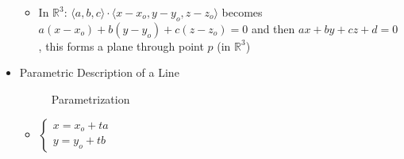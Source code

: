 \begin{itemize}
\begin{itemize}
\begin{itemize}
          \end{itemize}

        \item In $\mathbb{R}^3$: $\langle a, b, c \rangle \cdot \langle x - x_o, y - y_o, z - z_o \rangle$ becomes $a(x-x_o) + b(y-y_o) + c(z-z_o) = 0$ and then $ax + by + cz + d = 0$, this forms a plane through point $p$ (in $\mathbb{R}^3$)

      \end{itemize}

    \item Parametric Description of a Line

      \begin{figure}[h!]
        \centering 
        \caption{Parametrization}
      \end{figure}

      \begin{itemize}

        \item  $\left\{\begin{array}{c} x=x_o+ta\\y=y_o+tb\end{array}$

      \end{itemize}

\end{itemize}



